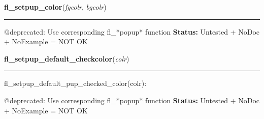     \label{xformslib:deprecated:fl_setpup_default_color}

    \vspace{0.5ex}

\hspace{.8\funcindent}\begin{boxedminipage}{\funcwidth}

    \raggedright \textbf{fl\_setpup\_color}(\textit{fgcolr}, \textit{bgcolr})

    \vspace{-1.5ex}

    \rule{\textwidth}{0.5\fboxrule}
\setlength{\parskip}{2ex}

@deprecated: Use corresponding fl\_*popup* function
\setlength{\parskip}{1ex}
\textbf{Status:} 
Untested + NoDoc + NoExample = NOT OK


    \end{boxedminipage}

    \label{xformslib:deprecated:fl_setpup_default_pup_checked_color}

    \vspace{0.5ex}

\hspace{.8\funcindent}\begin{boxedminipage}{\funcwidth}

    \raggedright \textbf{fl\_setpup\_default\_checkcolor}(\textit{colr})

    \vspace{-1.5ex}

    \rule{\textwidth}{0.5\fboxrule}
\setlength{\parskip}{2ex}

fl\_setpup\_default\_pup\_checked\_color(colr):

@deprecated: Use corresponding fl\_*popup* function
\setlength{\parskip}{1ex}
\textbf{Status:} 
Untested + NoDoc + NoExample = NOT OK


    \end{boxedminipage}

    \label{xformslib:deprecated:fl_setpup_default_pup_checked_color}

